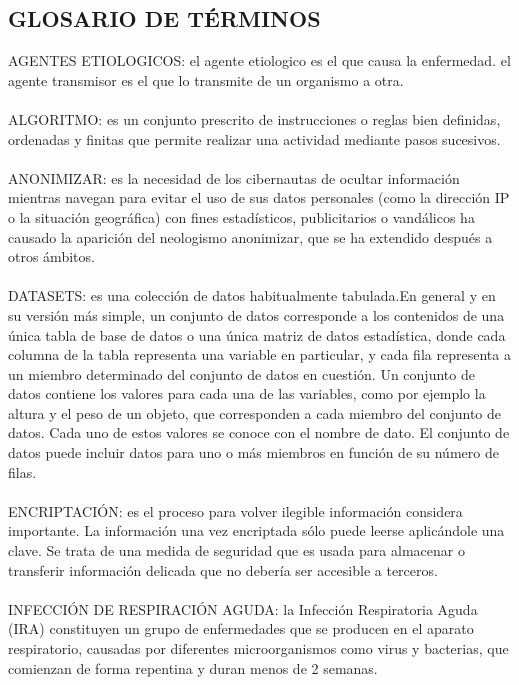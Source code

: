 \documentclass[a4paper,openright,12pt]{book}
\theoremstyle{definition}
\theoremstyle{remark}
\begin{document}
\begin{center}
 \chapter{GLOSARIO DE TÉRMINOS}\label{cap.glosario}
\end{center}
AGENTES ETIOLOGICOS: el agente etiologico es el que causa la enfermedad. el agente transmisor es el que lo transmite de un organismo a otra.\\\\
ALGORITMO: es un conjunto prescrito de instrucciones o reglas bien definidas, ordenadas y finitas que permite realizar una actividad mediante pasos sucesivos. \\\\
ANONIMIZAR: es la necesidad de los cibernautas de ocultar información mientras navegan para evitar el uso de sus datos personales (como la dirección IP o la situación geográfica) con fines estadísticos, publicitarios o vandálicos ha causado la aparición del neologismo anonimizar, que se ha extendido después a otros ámbitos.  \\\\
DATASETS: es una colección de datos habitualmente tabulada.En general y en su versión más simple, un conjunto de datos corresponde a los contenidos de una única tabla de base de datos o una única matriz de datos estadística, donde cada columna de la tabla representa una variable en particular, y cada fila representa a un miembro determinado del conjunto de datos en cuestión. Un conjunto de datos contiene los valores para cada una de las variables, como por ejemplo la altura y el peso de un objeto, que corresponden a cada miembro del conjunto de datos. Cada uno de estos valores se conoce con el nombre de dato. El conjunto de datos puede incluir datos para uno o más miembros en función de su número de filas.\\\\
ENCRIPTACIÓN: es el proceso para volver ilegible información considera importante. La información una vez encriptada sólo puede leerse aplicándole una clave. Se trata de una medida de seguridad que es usada para almacenar o transferir información delicada que no debería ser accesible a terceros.\\\\
INFECCIÓN DE RESPIRACIÓN AGUDA: la Infección Respiratoria Aguda (IRA) constituyen un grupo de enfermedades que se producen en el aparato respiratorio, causadas por diferentes microorganismos como virus y bacterias, que comienzan de forma repentina y duran menos de 2 semanas.
\end{document}
